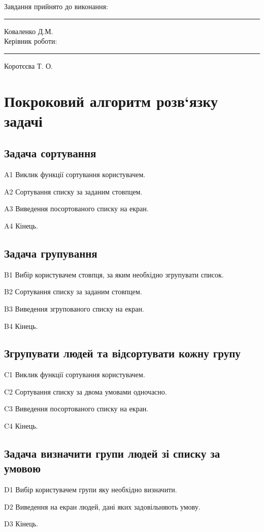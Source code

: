 \documentclass[oneside,14pt]{extarticle}
\begin{document}
Завдання прийнято до виконання: \rule{4cm}{0.15mm} Коваленко Д.М.\\
Керівник роботи: \rule{4cm}{0.15mm} Коротєєва Т. О.

\section{Покроковий алгоритм розв‘язку задачі}
\subsection{Задача сортування}
\begin{list}{}{Алгоритм A.}
	\item [A1] Виклик функції сортування користувачем.
	\item [A2] Сортування списку за заданим стовпцем.
	\item [A3] Виведення посортованого списку на екран.
	\item [A4] Кінець.
\end{list}

\subsection{Задача групування}
\begin{list}{}{Алгоритм B.}
	\item [B1] Вибір користувачем стовпця, за яким необхідно згрупувати список.
	\item [B2] Сортування списку за заданим стовпцем.
	\item [B3] Виведення згрупованого списку на екран.
	\item [B4] Кінець.
\end{list}

\subsection{Згрупувати людей та відсортувати кожну групу}
\begin{list}{}{Алгоритм C.}
	\item [C1] Виклик функції сортування користувачем.
	\item [C2] Сортування списку за двома умовами одночасно.
	\item [C3] Виведення посортованого списку на екран.
	\item [C4] Кінець.
\end{list}

\subsection{Задача визначити групи людей зі списку за умовою}
\begin{list}{}{Алгоритм D.}
	\item [D1] Вибір користувачем групи яку необхідно визначити.
	\item [D2] Виведення на екран людей, дані яких задовільняють умову.
	\item [D3] Кінець.
\end{list}
\end{document}
